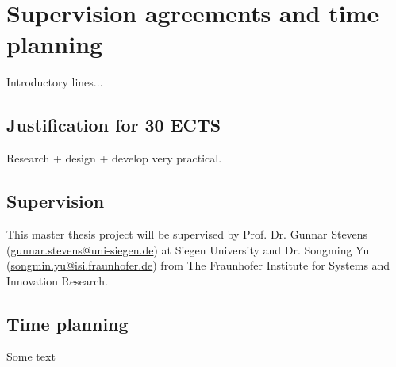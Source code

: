 \section{Supervision agreements and time planning} 




Introductory lines...


\subsection{Justification for 30 ECTS}


Research + design + develop
very practical. 


\subsection{Supervision}


This master thesis project will be supervised by 
Prof. Dr. Gunnar Stevens (\href{mailto:gunnar.stevens@uni-siegen.de}{gunnar.stevens@uni-siegen.de}) at Siegen University and 
Dr. Songming Yu (\href{mailto:songmin.yu@isi.fraunhofer.de}{songmin.yu@isi.fraunhofer.de}) from The Fraunhofer Institute for Systems and Innovation Research. 


\subsection{Time planning}


Some text \\

